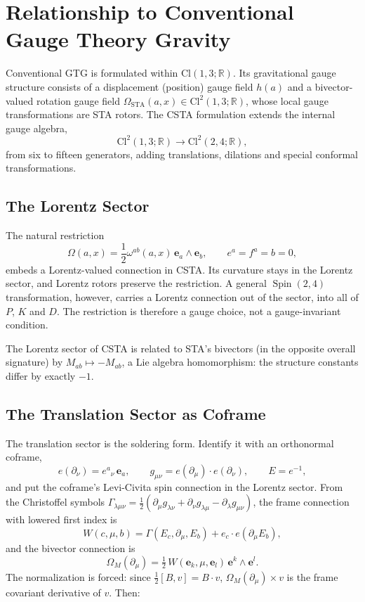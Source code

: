 \documentclass[11pt,a4paper]{article}
\newcommand{\Cl}{\mathrm{Cl}}
\newcommand{\R}{\mathbb{R}}
\newcommand{\Spin}{\operatorname{Spin}}
\newcommand{\Om}{\Omega}
\newcommand{\e}{\mathbf{e}}
\newcommand{\wedgeprod}{\mathbin{\wedge}}
\newcommand{\cross}{\mathbin{\times}}
\begin{document}
\section{Relationship to Conventional Gauge Theory Gravity}
\label{sec:gtg}

Conventional GTG is formulated within \(\Cl(1,3;\R)\). Its
gravitational gauge structure consists of a displacement (position)
gauge field \(h(a)\) and a bivector-valued rotation gauge field
\(\Om_{\mathrm{STA}}(a,x)\in\Cl^2(1,3;\R)\), whose local gauge
transformations are STA rotors. The CSTA formulation extends the
internal gauge algebra,
\[
    \Cl^2(1,3;\R)\longrightarrow\Cl^2(2,4;\R),
\]
from six to fifteen generators, adding translations, dilations and
special conformal transformations.

\subsection{The Lorentz Sector}

The natural restriction
\[
    \Om(a,x)=\frac12\omega^{ab}(a,x)\,\e_a\wedgeprod\e_b,
    \qquad
    e^a=f^a=b=0,
\]
embeds a Lorentz-valued connection in CSTA. Its curvature stays in the
Lorentz sector, and Lorentz rotors preserve the restriction. A general
\(\Spin(2,4)\) transformation, however, carries a Lorentz connection
out of the sector, into all of \(P\), \(K\) and \(D\). The restriction
is therefore a gauge choice, not a gauge-invariant condition.

The Lorentz sector of CSTA is related to STA's bivectors (in the
opposite overall signature) by \(M_{ab}\mapsto-M_{ab}\), a Lie algebra
homomorphism: the structure constants differ by exactly \(-1\).

\subsection{The Translation Sector as Coframe}
\label{sec:coframe}

The translation sector is the soldering form. Identify it with an
orthonormal coframe,
\[
    e(\partial_\nu)=e^a{}_\nu\,\e_a,
    \qquad
    g_{\mu\nu}=e(\partial_\mu)\cdot e(\partial_\nu),
    \qquad
    E=e^{-1},
\]
and put the coframe's Levi-Civita spin connection in the Lorentz
sector. From the Christoffel symbols
\(\Gamma_{\lambda\mu\nu}=\tfrac12(\partial_\mu g_{\lambda\nu}
+\partial_\nu g_{\lambda\mu}-\partial_\lambda g_{\mu\nu})\), the frame
connection with lowered first index is
\[
    W(c,\mu,b)=\Gamma(E_c,\partial_\mu,E_b)
    +e_c\cdot e(\partial_\mu E_b),
\]
and the bivector connection is
\[
    \Om_M(\partial_\mu)=\tfrac12\,W(\e_k,\mu,\e_l)\,\e^k\wedgeprod\e^l .
\]
The normalization is forced: since \(\tfrac12[B,v]=B\cdot v\),
\(\Om_M(\partial_\mu)\cross v\) is the frame covariant derivative of
\(v\). Then:
\end{document}
